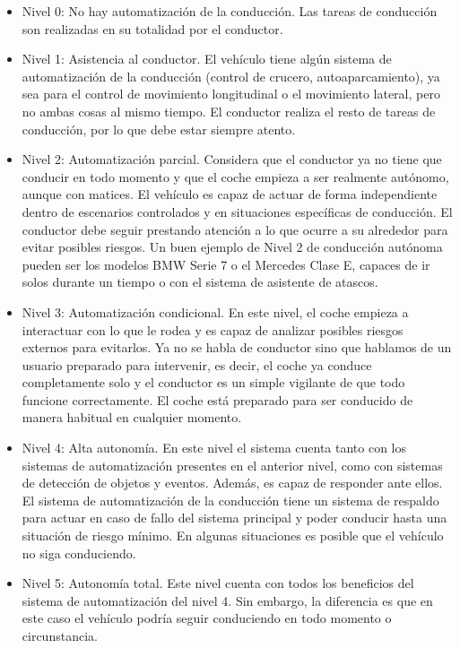 \begin{itemize}
\item Nivel 0: No hay automatización de la conducción. Las tareas de conducción son realizadas en su totalidad por el conductor.
\item	Nivel 1: Asistencia al conductor. El vehículo tiene algún sistema de automatización de la conducción (control de crucero, autoaparcamiento), ya sea para el control de movimiento longitudinal o el movimiento lateral, pero no ambas cosas al mismo tiempo. El conductor realiza el resto de tareas de conducción, por lo que debe estar siempre atento.
\item	Nivel 2: Automatización parcial. Considera que el conductor ya no tiene que conducir en todo momento y que el coche empieza a ser realmente autónomo, aunque con matices. El vehículo es capaz de actuar de forma independiente dentro de escenarios controlados y en situaciones específicas de conducción. El conductor debe seguir prestando atención a lo que ocurre a su alrededor para evitar posibles riesgos. Un buen ejemplo de Nivel 2 de conducción autónoma pueden ser los modelos BMW Serie 7 o el Mercedes Clase E, capaces de ir solos durante un tiempo o con el sistema de asistente de atascos.
\item	Nivel 3: Automatización condicional. En este nivel, el coche empieza a interactuar con lo que le rodea y es capaz de analizar posibles riesgos externos para evitarlos. Ya no se habla de conductor sino que hablamos de un usuario preparado para intervenir, es decir, el coche ya conduce completamente solo y el conductor es un simple vigilante de que todo funcione correctamente. El coche está preparado para ser conducido de manera habitual en cualquier momento. 
\item Nivel 4: Alta autonomía. En este nivel el sistema cuenta tanto con los sistemas de automatización presentes en el anterior nivel, como con sistemas de detección de objetos y eventos. Además, es capaz de responder ante ellos. El sistema de automatización de la conducción tiene un sistema de respaldo para actuar en caso de fallo del sistema principal y poder conducir hasta una situación de riesgo mínimo. En algunas situaciones es posible que el vehículo no siga conduciendo.
\item	Nivel 5: Autonomía total. Este nivel cuenta con todos los beneficios del sistema de automatización del nivel 4. Sin embargo, la diferencia es que en este caso el vehículo podría seguir conduciendo en todo momento o circunstancia.

\end{itemize}

